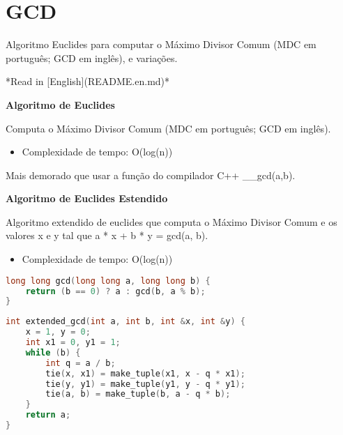 \documentclass[11pt, a4paper, oneside]{book}
\begin{document}
\hfill

\section{GCD}


Algoritmo Euclides para computar o Máximo Divisor Comum (MDC em português; GCD em inglês), e variações.



*Read in [English](README.en.md)*



\textbf{Algoritmo de Euclides} 



Computa o Máximo Divisor Comum (MDC em português; GCD em inglês).



\begin{itemize}
\item Complexidade de tempo: O(log(n))
\end{itemize}



Mais demorado que usar a função do compilador C++ \_\_gcd(a,b).



\textbf{Algoritmo de Euclides Estendido} 



Algoritmo extendido de euclides que computa o Máximo Divisor Comum e os valores x e y tal que a * x + b * y = gcd(a, b).



\begin{itemize}
\item Complexidade de tempo: O(log(n))
\end{itemize}

\hfill

\begin{multicols}{2}
\begin{lstlisting}[language=C++]
long long gcd(long long a, long long b) {
    return (b == 0) ? a : gcd(b, a % b);
}
\end{lstlisting}
\end{multicols}

\hfill

\begin{multicols}{2}
\begin{lstlisting}[language=C++]
int extended_gcd(int a, int b, int &x, int &y) {
    x = 1, y = 0;
    int x1 = 0, y1 = 1;
    while (b) {
        int q = a / b;
        tie(x, x1) = make_tuple(x1, x - q * x1);
        tie(y, y1) = make_tuple(y1, y - q * y1);
        tie(a, b) = make_tuple(b, a - q * b);
    }
    return a;
}
\end{lstlisting}
\end{multicols}
\end{document}

